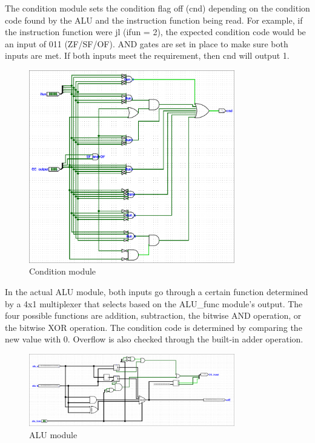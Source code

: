 \documentclass{article}
\begin{document}
The condition module sets the condition flag off (cnd) depending on the condition code found by the ALU and the instruction function being read. 
For example, if the instruction function were jl (ifun = 2), the expected condition code would be an input of 011 (ZF/SF/OF). 
AND gates are set in place to make sure both inputs are met. 
If both inputs meet the requirement, then cnd will output 1. 

\begin{figure}[H]
    \centering
    \includegraphics[width=0.8\textwidth]{./images/cond.png}
    \caption{Condition module}
\end{figure}

In the actual ALU module, both inputs go through a certain function determined by a 4x1 multiplexer that selects based on the ALU\_func module's output. 
The four possible functions are addition, subtraction, the bitwise AND operation, or the bitwise XOR operation. 
The condition code is determined by comparing the new value with 0. 
Overflow is also checked through the built-in adder operation. 

\begin{figure}[H]
    \centering
    \includegraphics[width=0.8\textwidth]{./images/alu.png}
    \caption{ALU module}
\end{figure}
\end{document}

